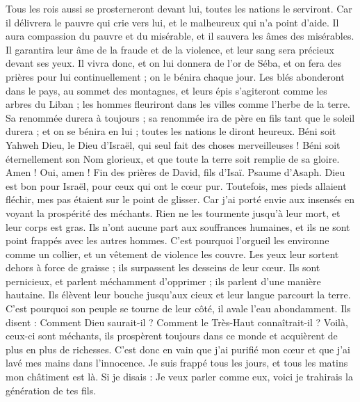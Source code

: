 \begin{multicols}{2}
Tous les rois aussi se prosterneront devant lui, toutes les nations le serviront.
Car il délivrera le pauvre qui crie vers lui, et le malheureux qui n’a point d’aide.
Il aura compassion du pauvre et du misérable, et il sauvera les âmes des misérables.
Il garantira leur âme de la fraude et de la violence, et leur sang sera précieux devant ses yeux.
Il vivra donc, et on lui donnera de l'or de Séba, et on fera des prières pour lui continuellement ; on le bénira chaque jour.
Les blés abonderont dans le pays, au sommet des montagnes, et leurs épis s’agiteront comme les arbres du Liban ; les hommes fleuriront dans les villes comme l'herbe de la terre.
Sa renommée durera à toujours ; sa renommée ira de père en fils tant que le soleil durera ; et on se bénira en lui ; toutes les nations le diront heureux.
Béni soit Yahweh Dieu, le Dieu d'Israël, qui seul fait des choses merveilleuses !
Béni soit éternellement son Nom glorieux, et que toute la terre soit remplie de sa gloire. Amen ! Oui, amen !
Fin des prières de David, fils d'Isaï.
\VerseOne{}Psaume d'Asaph. Dieu est bon pour Israël, pour ceux qui ont le cœur pur.
Toutefois, mes pieds allaient fléchir, mes pas étaient sur le point de glisser.
Car j'ai porté envie aux insensés en voyant la prospérité des méchants.
Rien ne les tourmente jusqu’à leur mort, et leur corps est gras.
Ils n’ont aucune part aux souffrances humaines, et ils ne sont point frappés avec les autres hommes.
C'est pourquoi l'orgueil les environne comme un collier, et un vêtement de violence les couvre.
Les yeux leur sortent dehors à force de graisse ; ils surpassent les desseins de leur cœur.
Ils sont pernicieux, et parlent méchamment d'opprimer ; ils parlent d’une manière hautaine.
Ils élèvent leur bouche jusqu’aux cieux et leur langue parcourt la terre.
C'est pourquoi son peuple se tourne de leur côté, il avale l'eau abondamment.
Ils disent : Comment Dieu saurait-il ? Comment le Très-Haut connaîtrait-il ?
Voilà, ceux-ci sont méchants, ils prospèrent toujours dans ce monde et acquièrent de plus en plus de richesses.
C'est donc en vain que j'ai purifié mon cœur et que j'ai lavé mes mains dans l'innocence.
Je suis frappé tous les jours, et tous les matins mon châtiment est là.
Si je disais : Je veux parler comme eux, voici je trahirais la génération de tes fils.

\end{multicols}

